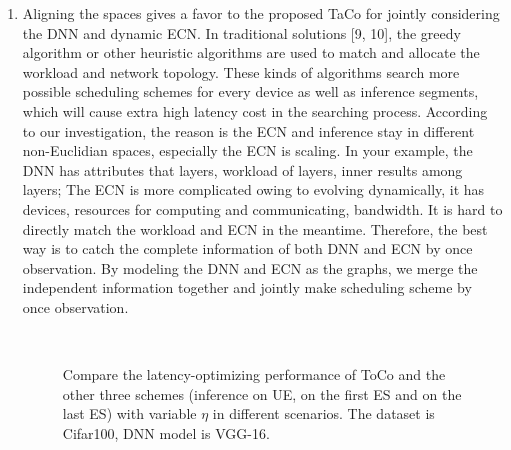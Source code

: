 \documentclass{ar2rc}
\begin{document}
\begin{enumerate}
	\item Aligning the spaces gives a favor to the proposed TaCo for jointly considering the DNN and dynamic ECN. In traditional solutions [9, 10], the greedy algorithm or other heuristic algorithms are used to match and allocate the workload and network topology. These kinds of algorithms search more possible scheduling schemes for every device as well as inference segments, which will cause extra high latency cost in the searching process. According to our investigation, the reason is the ECN and inference stay in different non-Euclidian spaces, especially the ECN is scaling. In your example, the DNN has attributes that layers, workload of layers, inner results among layers; The ECN is more complicated owing to evolving dynamically, it has devices, resources for computing and communicating, bandwidth. It is hard to directly match the workload and ECN in the meantime. Therefore, the best way is to catch the complete information of both DNN and ECN by once observation. By modeling the DNN and ECN as the graphs, we merge the independent information together and jointly make scheduling scheme by once observation.
	
   \setcounter{figure}{9} %
	\begin{figure}[t]
      \centering
      \hfill %
      \\ %
      \hfill %
      \caption{Compare the latency-optimizing performance of ToCo and the other three schemes (inference on UE, on the first ES and on the last ES) with variable $\eta$ in different scenarios. The dataset is Cifar100, DNN model is VGG-16.}\label{fig:APtimesUE_TaCo_cifar100_vgg16}
   \end{figure}


\end{enumerate}
\end{document}
